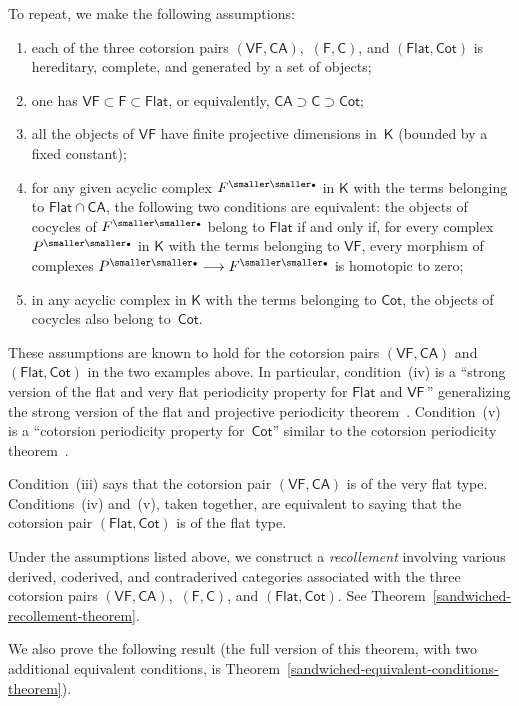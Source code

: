 \documentclass[12pt,a4paper]{amsart}
\newcommand{\+}{\nobreakdash-}
\renewcommand{\:}{\colon}
\newcommand{\rarrow}{\longrightarrow}
\newcommand{\bu}{{\text{\smaller\smaller$\scriptstyle\bullet$}}}
\newcommand{\sC}{\mathsf C}
\newcommand{\sF}{\mathsf F}
\newcommand{\sK}{\mathsf K}
\newcommand{\VF}{\mathsf{VF}}
\newcommand{\CA}{\mathsf{CA}}
\newcommand{\Flat}{\mathsf{Flat}}
\newcommand{\Cot}{\mathsf{Cot}}
\theoremstyle{plain}
\theoremstyle{definition}
\begin{document}
 To repeat, we make the following assumptions:
\begin{enumerate}
\renewcommand{\theenumi}{\roman{enumi}}
\item each of the three cotorsion pairs $(\VF,\CA)$, \,$(\sF,\sC)$,
and $(\Flat,\Cot)$ is hereditary, complete, and generated by a set
of objects;
\item one has $\VF\subset\sF\subset\Flat$, or equivalently,
$\CA\supset\sC\supset\Cot$;
\item all the objects of $\VF$ have finite projective dimensions
in~$\sK$ (bounded by a fixed constant);
\item for any given acyclic complex $F^\bu$ in\/ $\sK$ with the terms 
belonging to\/ $\Flat\cap\CA$, the following two conditions are
equivalent: the objects of cocycles of $F^\bu$ belong to\/ $\Flat$
if and only if, for every complex $P^\bu$ in\/ $\sK$ with the terms
belonging to\/ $\VF$, every morphism of complexes $P^\bu\rarrow F^\bu$
is homotopic to zero;
\item in any acyclic complex in\/ $\sK$ with the terms belonging to\/
$\Cot$, the objects of cocycles also belong to\/~$\Cot$.
\end{enumerate}
 These assumptions are known to hold for the cotorsion pairs
$(\VF,\CA)$ and $(\Flat,\Cot)$ in the two examples above.
 In particular, condition~(iv) is a ``strong version of the flat and
very flat periodicity property for $\Flat$ and $\VF$\,'' generalizing
the strong version of the flat and projective periodicity
theorem~\cite[Theorem~8.6\,(iii)\,$\Leftrightarrow$\,(i)]{Neem}.
 Condition~(v) is a ``cotorsion periodicity property for~$\Cot$''
similar to the cotorsion periodicity theorem~\cite[Theorem~5.1(2)]{BCE}.

 Condition~(iii) says that the cotorsion pair $(\VF,\CA)$ is of
the very flat type.
 Conditions~(iv) and~(v), taken together, are equivalent to saying
that the cotorsion pair $(\Flat,\Cot)$ is of the flat type.

 Under the assumptions listed above, we construct a \emph{recollement}
involving various derived, coderived, and contraderived categories
associated with the three cotorsion pairs $(\VF,\CA)$,
\,$(\sF,\sC)$, and $(\Flat,\Cot)$.
 See Theorem~\ref{sandwiched-recollement-theorem}.

 We also prove the following result (the full version of this
theorem, with two additional equivalent conditions, is
Theorem~\ref{sandwiched-equivalent-conditions-theorem}).
\end{document}
